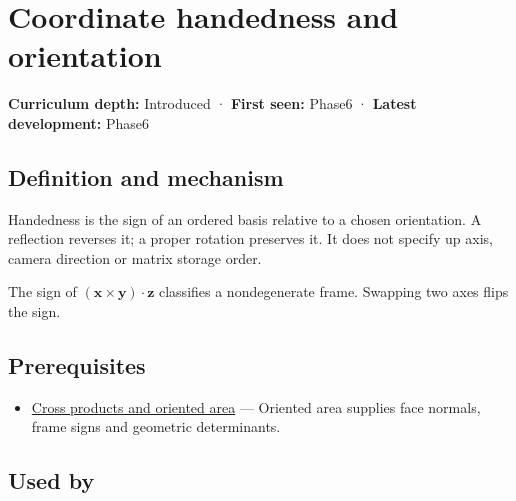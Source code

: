 \hypertarget{appendix-87d7626c8d37}{}\label{referencestart:appendix-87d7626c8d37}
\section{Coordinate handedness and orientation}\label{appendix-87d7626c8d37-coordinate-handedness-and-orientation}

\hypertarget{appendix-87d7626c8d37-coordinate-handedness-and-orientation}{}

\textbf{Curriculum depth:} Introduced · \textbf{First seen:} Phase6 · \textbf{Latest development:} Phase6

\begin{allmightroledefinition}

\subsection{Definition and mechanism}\label{appendix-87d7626c8d37-definition-and-mechanism}

\hypertarget{appendix-87d7626c8d37-definition-and-mechanism}{}

Handedness is the sign of an ordered basis relative to a chosen orientation. A reflection reverses it; a proper rotation preserves it. It does not specify up axis, camera direction or matrix storage order.

\end{allmightroledefinition}

The sign of \((\mathbf x\times\mathbf y)\cdot\mathbf z\) classifies a nondegenerate frame. Swapping two axes flips the sign.

\subsection{Prerequisites}\label{appendix-87d7626c8d37-prerequisites}

\hypertarget{appendix-87d7626c8d37-prerequisites}{}

\begin{itemize}
\tightlist
\item
  \hyperref[appendix-2391db8052b1]{Cross products and oriented area} --- Oriented area supplies face normals, frame signs and geometric determinants.
\end{itemize}

\subsection{Used by}\label{appendix-87d7626c8d37-used-by}

